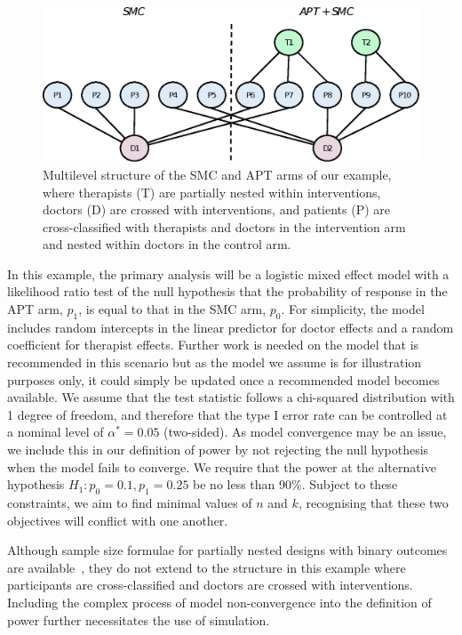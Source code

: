 \documentclass{article}
\begin{document}
\begin{figure}
\centering
\includegraphics[scale=0.7]{ex1_structure}
\caption{Multilevel structure of the SMC and APT arms of our example, where therapists (T) are partially nested within interventions, doctors (D) are crossed with interventions, and patients (P) are cross-classified with therapists and doctors in the intervention arm and nested within doctors in the control arm.}
\label{fig:ex1_structure}
\end{figure}

In this example, the primary analysis will be a logistic mixed effect model with a likelihood ratio test of the null hypothesis that the probability of response in the APT arm, $p_1$, is equal to that in the SMC arm, $p_0$. For simplicity, the model includes random intercepts in the linear predictor for doctor effects and a random coefficient for therapist effects. Further work is needed on the model that is recommended in this scenario but as the model we assume is for illustration purposes only, it could simply be updated once a recommended model becomes available. We assume that the test statistic follows a chi-squared distribution with 1 degree of freedom, and therefore that the type I error rate can be controlled at a nominal level of $\alpha^* = 0.05$ (two-sided). As model convergence may be an issue, we include this in our definition of power by not rejecting the null hypothesis when the model fails to converge. We require that the power at the alternative hypothesis $H_1: p_0=0.1, p_1=0.25$ be no less than 90\%. Subject to these constraints, we aim to find minimal values of $n$ and $k$, recognising that these two objectives will conflict with one another. 

Although sample size formulae for partially nested designs with binary outcomes are available~\cite{Roberts2015}, they do not extend to the structure in this example where participants are cross-classified and doctors are crossed with interventions. Including the complex process of model non-convergence into the definition of power further necessitates the use of simulation.
\end{document}
